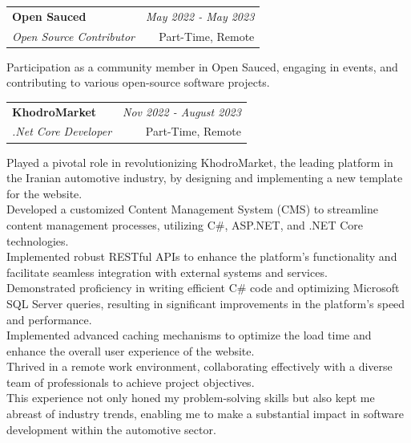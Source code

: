 \documentclass[a4paper,10pt]{article}
\makeatletter
\newcommand{\resumeSubheading}[4]{
	\vspace{0.5mm}\item
	\begin{tabular*}{0.98\textwidth}[t]{l@{\extracolsep{\fill}}r}
		\textbf{#1} & \textit{\footnotesize{#4}} \\
		\textit{\footnotesize{#3}} &  \footnotesize{#2}\\
	\end{tabular*}
	\vspace{-2.4mm}
}
\newcommand{\resumeItemListStart}{\begin{justify}\begin{itemize}[leftmargin=3ex, rightmargin=2ex, noitemsep,labelsep=1.2mm,itemsep=0mm]\small}
\newcommand{\resumeItemListEnd}{\end{itemize}\end{justify}\vspace{-2mm}}
\makeatother
\begin{document}
\vspace{-1mm}
\resumeSubheading
{Open Sauced}{Part-Time, Remote}
{Open Source Contributor}{May 2022 - May 2023}
\resumeItemListStart
Participation as a community member in Open Sauced, engaging in events, and contributing to various open-source software projects.
\resumeItemListEnd

\vspace{-1mm}
\resumeSubheading
{KhodroMarket}{Part-Time, Remote}
{.Net Core Developer}{Nov 2022 - August 2023}
\resumeItemListStart
Played a pivotal role in revolutionizing KhodroMarket, the leading platform in the Iranian automotive industry, by designing and implementing a new template for the website.\\
Developed a customized Content Management System (CMS) to streamline content management processes, utilizing C\#, ASP.NET, and .NET Core technologies.\\
Implemented robust RESTful APIs to enhance the platform's functionality and facilitate seamless integration with external systems and services.\\
Demonstrated proficiency in writing efficient C\# code and optimizing Microsoft SQL Server queries, resulting in significant improvements in the platform's speed and performance.\\
Implemented advanced caching mechanisms to optimize the load time and enhance the overall user experience of the website.\\
Thrived in a remote work environment, collaborating effectively with a diverse team of professionals to achieve project objectives.\\
This experience not only honed my problem-solving skills but also kept me abreast of industry trends, enabling me to make a substantial impact in software development within the automotive sector.
\resumeItemListEnd
\end{document}
